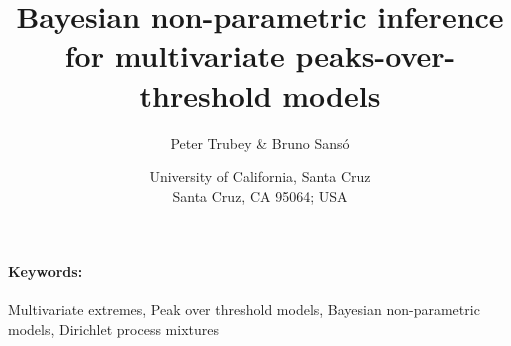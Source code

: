 \documentclass{article}
\title{Bayesian non-parametric inference for multivariate peaks-over-threshold models}
\author{Peter Trubey \& Bruno Sans\'{o}}
\date{University of California, Santa Cruz \\ Santa Cruz, CA 95064; USA}
\begin{document}
\maketitle


\begin{abstract}
    
\end{abstract}

\paragraph{Keywords:}  Multivariate extremes, Peak over threshold models, Bayesian non-parametric models, Dirichlet process mixtures
\end{document}
